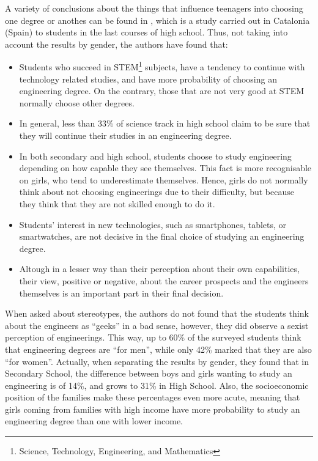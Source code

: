 \documentclass[journal,transmag]{IEEEtran}
\begin{document}
A variety of conclusions about the things that influence teenagers into choosing one degree or anothes can be found in \cite{everis2012}, which is a study carried out in Catalonia (Spain) to students in the last courses of high school. Thus, not taking into account the results by gender, the authors have found that:

\begin{itemize}
	\item Students who succeed in STEM\footnote{Science, Technology, Engineering, and Mathematics} subjects, have a tendency to continue with technology related studies, and have more probability of choosing an engineering degree. On the contrary, those that are not very good at STEM normally choose other degrees.
	\item In general, less than 33\% of science track in high school claim to be sure that they will continue their studies in an engineering degree.
	\item In both secondary and high school, students choose to study engineering depending on how capable they see themselves. This fact is more recognisable on girls, who tend to underestimate themselves. Hence, girls do not normally think about not choosing engineerings due to their difficulty, but because they think that they are not skilled enough to do it.
	\item Students' interest in new technologies, such as smartphones, tablets, or smartwatches, are not decisive in the final choice of studying an engineering degree.
	\item Altough in a lesser way than their perception about their own capabilities, their view, positive or negative, about the career prospects and the engineers themselves is an important part in their final decision.
\end{itemize}

When asked about stereotypes, the authors do not found that the students think about the engineers as ``geeks'' in a bad sense, however, they did observe a sexist perception of engineerings. This way, up to 60\% of the surveyed students think that engineering degrees are ``for men'', while only 42\% marked that they are also ``for women''. Actually, when separating the results by gender, they found that in Secondary School, the difference between boys and girls wanting to study an engineering is of 14\%, and grows to 31\% in High School. Also, the socioeconomic position of the families make these percentages even more acute, meaning that girls coming from families with high income have more probability to study an engineering degree than one with lower income.
\end{document}
